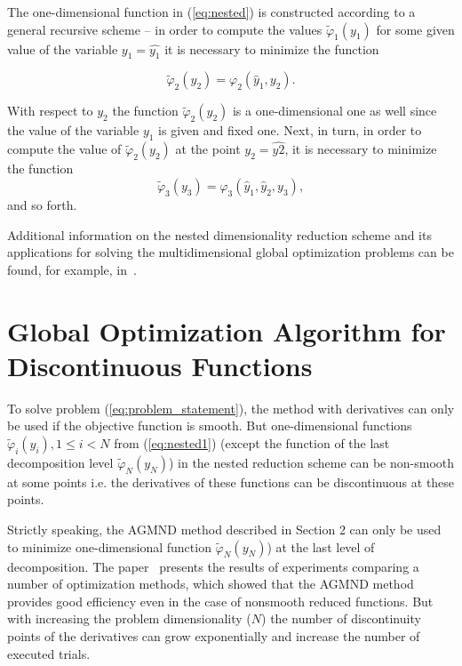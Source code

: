 \documentclass[runningheads]{llncs}
\begin{document}
The one-dimensional function in (\ref{eq:nested}) is constructed according to a general recursive scheme -- in order to compute the values $\widetilde{\varphi}_1(y_1)$ for some given value of the variable
$y_1 = \widehat{y_1}$ it is necessary to minimize the function

\begin{equation}
\widetilde{\varphi}_2(y_2) = \varphi_2(\widehat{y}_1,y_2).
\end{equation}

With respect to $y_2$ the function $\widetilde{\varphi}_2(y_2)$ is a one-dimensional one as well since the value of the variable $y_1$ is given and fixed one. Next, in turn, in order to compute the value of $\widetilde{\varphi}_2(y_2)$ at the point $y_2 = \widehat{y2}$, it is necessary to minimize the function
\begin{equation}
\widetilde{\varphi}_3(y_3) = \varphi_3(\widehat{y}_1,\widehat{y}_2,y_3),
\end{equation}
and so forth.

Additional information on the nested dimensionality reduction scheme and its applications for solving the multidimensional global optimization problems can be found, for example, in~\cite{Dam2010,Shi2000,Strongin2000,Strongin2013}.


\section{Global Optimization Algorithm for Discontinuous Functions}\label{sec:GOADF}

To solve problem (\ref{eq:problem_statement}), the method with derivatives can only be used if the objective function is smooth. But one-dimensional functions $\widetilde{\varphi}_i(y_i), 1 \le i < N$ from (\ref{eq:nested1}) (except the function of the
last decomposition level $\widetilde{\varphi}_N(y_N)$) in the nested reduction scheme can be non-smooth at some points i.e. the derivatives of these functions can be discontinuous at these points.

Strictly speaking, the AGMND method described in Section 2 can only be used to minimize one-dimensional function $\widetilde{\varphi}_N(y_N)$) at the last level of decomposition. The paper~\cite{Gergel2019} presents the results of experiments comparing a number of optimization methods, which showed that the AGMND method provides good efficiency even in the case of nonsmooth reduced functions. But with increasing the problem dimensionality ($N$) the number of discontinuity points of the derivatives can grow exponentially and increase the number of executed trials.
\end{document}
